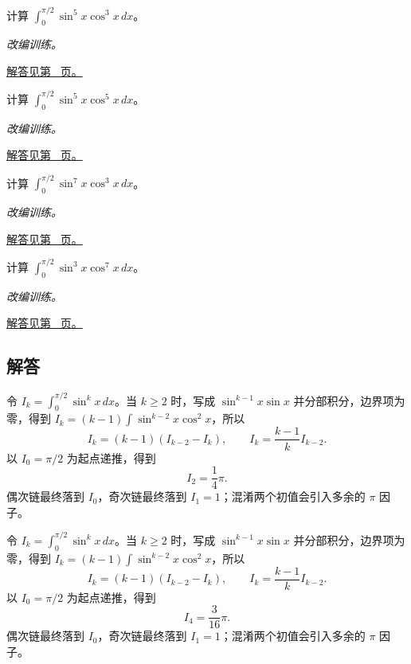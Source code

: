 \documentclass[UTF8,12pt,a4paper,fontset=fandol]{ctexart}
\begin{document}
\begin{example}[两种奇次幂的混合积分]\label{ex:c16q21}
计算 $\int_0^{\pi/2}\sin^{5}x\cos^{3}x\,dx$。
\par\textit{改编训练。}\par\hyperref[ans:c16q21]{解答见第~\pageref{ans:c16q21} 页。}
\end{example}
\begin{example}[两种奇次幂的混合积分]\label{ex:c16q22}
计算 $\int_0^{\pi/2}\sin^{5}x\cos^{5}x\,dx$。
\par\textit{改编训练。}\par\hyperref[ans:c16q22]{解答见第~\pageref{ans:c16q22} 页。}
\end{example}
\begin{example}[两种奇次幂的混合积分]\label{ex:c16q23}
计算 $\int_0^{\pi/2}\sin^{7}x\cos^{3}x\,dx$。
\par\textit{改编训练。}\par\hyperref[ans:c16q23]{解答见第~\pageref{ans:c16q23} 页。}
\end{example}
\begin{example}[两种奇次幂的混合积分]\label{ex:c16q24}
计算 $\int_0^{\pi/2}\sin^{3}x\cos^{7}x\,dx$。
\par\textit{改编训练。}\par\hyperref[ans:c16q24]{解答见第~\pageref{ans:c16q24} 页。}
\end{example}
\subsection{解答}
\begin{solve}\label{ans:c16q1}
令 $I_k=\int_0^{\pi/2}\sin^kx\,dx$。当 $k\ge2$ 时，写成 $\sin^{k-1}x\sin x$ 并分部积分，边界项为零，得到 $I_k=(k-1)\int\sin^{k-2}x\cos^2x$，所以
\[
I_k=(k-1)(I_{k-2}-I_k),\qquad I_k=\frac{k-1}{k}I_{k-2}.
\]
以 $I_0=\pi/2$ 为起点递推，得到
\[
I_{2}=\frac{1}{4}\pi.
\]
偶次链最终落到 $I_0$，奇次链最终落到 $I_1=1$；混淆两个初值会引入多余的 $\pi$ 因子。
\end{solve}

\begin{solve}\label{ans:c16q2}
令 $I_k=\int_0^{\pi/2}\sin^kx\,dx$。当 $k\ge2$ 时，写成 $\sin^{k-1}x\sin x$ 并分部积分，边界项为零，得到 $I_k=(k-1)\int\sin^{k-2}x\cos^2x$，所以
\[
I_k=(k-1)(I_{k-2}-I_k),\qquad I_k=\frac{k-1}{k}I_{k-2}.
\]
以 $I_0=\pi/2$ 为起点递推，得到
\[
I_{4}=\frac{3}{16}\pi.
\]
偶次链最终落到 $I_0$，奇次链最终落到 $I_1=1$；混淆两个初值会引入多余的 $\pi$ 因子。
\end{solve}
\end{document}
